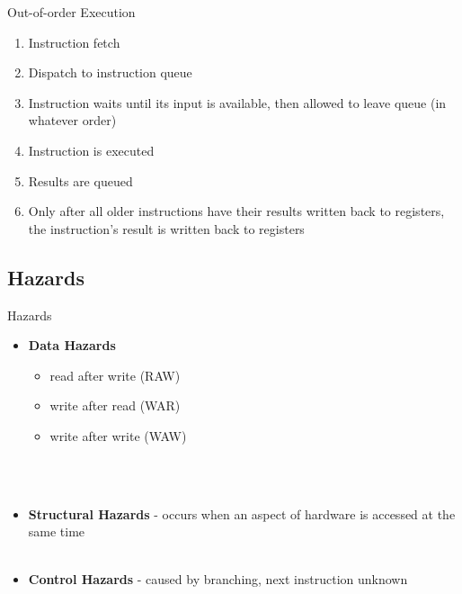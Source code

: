 \documentclass{beamer}
\begin{document}
\begin{darkframes}
\begin{frame}{Out-of-order Execution}
	\begin{enumerate}
  \item Instruction fetch
  \item Dispatch to instruction queue
  \item Instruction waits until its input is available, then allowed to leave queue (in whatever order)
  \item Instruction is executed
  \item Results are queued
  \item Only after all older instructions have their results written back to registers, the instruction's result is written back to registers 
	\end{enumerate}
\end{frame}

\subsection{Hazards}
\begin{frame}{Hazards}
	\begin{itemize}
		\item {\bf \color{green} Data Hazards}
		\begin{itemize}
			\item read after write {\color{cyan} (RAW)}
			\item write after read {\color{cyan} (WAR)}
			\item write after write {\color{cyan} (WAW)}
		\end{itemize}
		\qquad \\
		\qquad \\
		\pause
		\item {\bf \color{green}  Structural Hazards} - occurs when an aspect of hardware is accessed at the same time
		\qquad \\
		\qquad \\
		\pause
		\item {\bf \color{green} Control Hazards} - caused by branching, next instruction unknown
	\end{itemize}
\end{frame}


\end{darkframes}
\end{document}
